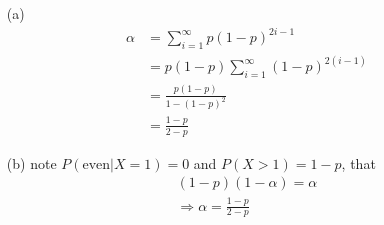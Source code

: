 \documentclass[paper=a4, fontsize=11pt]{scrartcl} %
\numberwithin{equation}{section} %
\numberwithin{figure}{section} %
\numberwithin{table}{section} %
\begin{document}
\begin{itemize}
	\begin{itemize}
		\item[(a)]
		\begin{align}
			\alpha &= \sum_{i=1}^\infty  p(1-p)^{2i-1} \\
				&= p(1-p) \sum_{i=1}^\infty (1-p)^{2(i-1)} \\
				&= \frac{p(1-p)}{1-(1-p)^2} \\
				&= \frac{1-p}{2-p}
		\end{align}
		\item[(b)] note $P(\text{even}|X=1)=0$ and $P(X>1)=1-p$, that
		\begin{align}
			(1-p)(1-\alpha) = \alpha \\
			\Rightarrow \alpha = \frac{1-p}{2-p}
		\end{align}
	\end{itemize}
\end{itemize}
\end{document}
